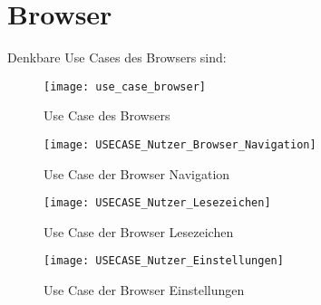 \author{Gottfried von Recum}

\section{Browser}

Denkbare Use Cases des Browsers sind:
\begin{figure}
	\centering
	\texttt{[image: use\_case\_browser]}
	\caption{Use Case des Browsers}
	\label{fig:Browser Use-Case}
\end{figure}
\pagebreak

\begin{figure}
	\centering
	\texttt{[image: USECASE\_Nutzer\_Browser\_Navigation]}
	\caption{Use Case der Browser Navigation}
	\label{fig:Browser Navigation Use-Case}
\end{figure}
\pagebreak

\begin{figure}
	\centering
	\texttt{[image: USECASE\_Nutzer\_Lesezeichen]}
	\caption{Use Case der Browser Lesezeichen}
	\label{fig:Browser Lesezeichen Use-Case}
\end{figure}
\pagebreak

\begin{figure}
	\centering
	\texttt{[image: USECASE\_Nutzer\_Einstellungen]}
	\caption{Use Case der Browser Einstellungen}
	\label{fig:Browser Einstellungen Use-Case}
\end{figure}
\pagebreak